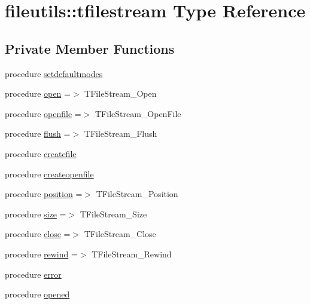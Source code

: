 \hypertarget{structfileutils_1_1tfilestream}{}\section{fileutils\+:\+:tfilestream Type Reference}
\label{structfileutils_1_1tfilestream}
\subsection*{Private Member Functions}
\begin{DoxyCompactItemize}
\item 
procedure \mbox{\hyperlink{structfileutils_1_1tfilestream_a13c544859830108ad8545b58d4248f55}{setdefaultmodes}}
\item 
procedure \mbox{\hyperlink{structfileutils_1_1tfilestream_a9b3101f1d7f8a186b67d507ad71be083}{open}} =$>$ T\+File\+Stream\+\_\+\+Open
\item 
procedure \mbox{\hyperlink{structfileutils_1_1tfilestream_a1513c745db83c070dc694ecc3f4fca28}{openfile}} =$>$ T\+File\+Stream\+\_\+\+Open\+File
\item 
procedure \mbox{\hyperlink{structfileutils_1_1tfilestream_ac59d18c87afc25298d70531fac9efa7c}{flush}} =$>$ T\+File\+Stream\+\_\+\+Flush
\item 
procedure \mbox{\hyperlink{structfileutils_1_1tfilestream_af24d790216b5fcea043b4b4e493c6e80}{createfile}}
\item 
procedure \mbox{\hyperlink{structfileutils_1_1tfilestream_af133d2fe81931b2352ff7203a9927a1c}{createopenfile}}
\item 
procedure \mbox{\hyperlink{structfileutils_1_1tfilestream_a23ec69f32d12394f941136e1275f2d96}{position}} =$>$ T\+File\+Stream\+\_\+\+Position
\item 
procedure \mbox{\hyperlink{structfileutils_1_1tfilestream_aad081c4b1010fa2b6c6edabf16dd7562}{size}} =$>$ T\+File\+Stream\+\_\+\+Size
\item 
procedure \mbox{\hyperlink{structfileutils_1_1tfilestream_adc4c0ea57628e670378555814c88c52a}{close}} =$>$ T\+File\+Stream\+\_\+\+Close
\item 
procedure \mbox{\hyperlink{structfileutils_1_1tfilestream_af669a2d8d5c12fa2723fc68646a921f5}{rewind}} =$>$ T\+File\+Stream\+\_\+\+Rewind
\item 
procedure \mbox{\hyperlink{structfileutils_1_1tfilestream_a84f97fd52730e6db1e5e335b5e2f564f}{error}}
\item 
procedure \mbox{\hyperlink{structfileutils_1_1tfilestream_a8c0f8e1e1db53d00f9a526a161dab227}{opened}}

\end{DoxyCompactItemize}
